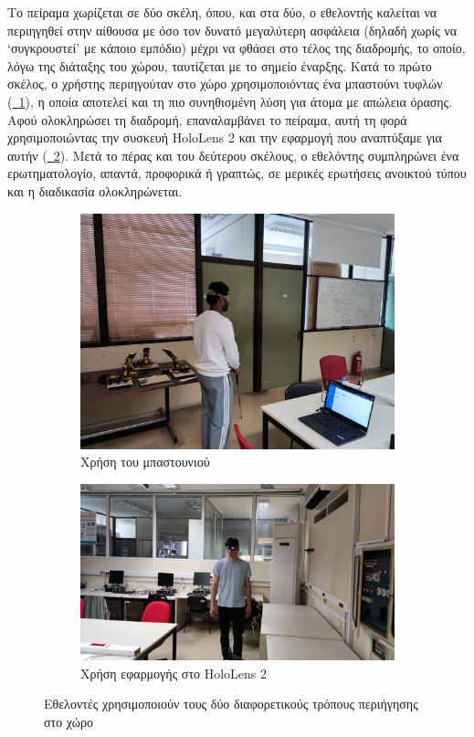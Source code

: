 Το πείραμα χωρίζεται σε δύο σκέλη, όπου, και στα δύο, ο εθελοντής καλείται να περιηγηθεί στην αίθουσα με όσο τον δυνατό μεγαλύτερη ασφάλεια (δηλαδή χωρίς να `συγκρουστεί' με κάποιο εμπόδιο) μέχρι να φθάσει στο τέλος της διαδρομής, το οποίο, λόγω της διάταξης του χώρου, ταυτίζεται με το σημείο έναρξης. Κατά το πρώτο σκέλος, ο χρήστης περιηγούταν στο χώρο χρησιμοποιόντας ένα μπαστούνι τυφλών (\hyperref[fig:experimentCane]{\schema~\ref*{fig:experimentCane}}), η οποία αποτελεί και τη πιο συνηθισμένη λύση για άτομα με απώλεια όρασης. Αφού ολοκληρώσει τη διαδρομή, επαναλαμβάνει το πείραμα, αυτή τη φορά χρησιμοποιώντας την συσκευή HoloLens 2 και την εφαρμογή που αναπτύξαμε για αυτήν (\hyperref[fig:experimentHololens]{\schema~\ref*{fig:experimentHololens}}). Μετά το πέρας και του δεύτερου σκέλους, ο εθελόντης συμπληρώνει ένα ερωτηματολογίο, απαντά, προφορικά ή γραπτώς, σε μερικές ερωτήσεις ανοικτού τύπου και η διαδικασία ολοκληρώνεται.

\begin{figure}[!h]
  \centering
  \begin{subfigure}{0.5\textwidth}
    \centering
    \includegraphics[width=0.7\linewidth]{images/experimentCane.jpg}
    \caption{Χρήση του μπαστουνιού}\label{fig:experimentCane}
  \end{subfigure}%
  \begin{subfigure}{0.5\textwidth}
    \centering
    \includegraphics[width=0.9\linewidth]{images/experimentHololens.jpg}
    \caption{Χρήση εφαρμογής στο HoloLens 2}\label{fig:experimentHololens}
  \end{subfigure}%
  \caption{Εθελοντές χρησιμοποιούν τους δύο διαφορετικούς τρόπους περιήγησης στο χώρο}\label{fig:experimentNavMethods}
\end{figure}

